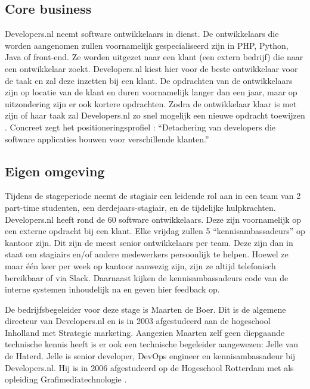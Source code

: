 \subsection{Core business}
Developers.nl neemt software ontwikkelaars in dienst. De ontwikkelaars die worden aangenomen zullen voornamelijk gespecialiseerd zijn in PHP, Python, Java of front-end. Ze worden uitgezet naar een klant (een extern bedrijf) die naar een ontwikkelaar zoekt. Developers.nl kiest hier voor de beste ontwikkelaar voor de taak en zal deze inzetten bij een klant. De opdrachten van de ontwikkelaars zijn op locatie van de klant en duren voornamelijk langer dan een jaar, maar op uitzondering zijn er ook kortere opdrachten. Zodra de ontwikkelaar klaar is met zijn of haar taak zal Developers.nl zo snel mogelijk een nieuwe opdracht toewijzen \parencite{Stageplan}. Concreet zegt het positioneringsprofiel \parencite{Positioneringsprofiel}: \enquote{Detachering van developers die software applicaties bouwen voor verschillende klanten.}

\subsection{Eigen omgeving}

Tijdens de stageperiode neemt de stagiair een leidende rol aan in een team van 2 part-time studenten, een derdejaars-stagiair, en de tijdelijke hulpkrachten. Developers.nl heeft rond de 60 software ontwikkelaars. Deze zijn voornamelijk op een externe opdracht bij een klant. Elke vrijdag zullen 5 \enquote{kennisambassadeurs} op kantoor zijn. Dit zijn de meest senior ontwikkelaars per team. Deze zijn dan in staat om stagiairs en/of andere medewerkers persoonlijk te helpen. Hoewel ze maar één keer per week op kantoor aanwezig zijn, zijn ze altijd telefonisch bereikbaar of via Slack. Daarnaast kijken de kennisambassadeurs code van de interne systemen inhoudelijk na en geven hier feedback op.

De bedrijfsbegeleider voor deze stage is Maarten de Boer. Dit is de algemene directeur van Developers.nl en is in 2003 afgestudeerd aan de hogeschool Inholland met Strategic marketing. Aangezien Maarten zelf geen diepgaande technische kennis heeft is er ook een technische begeleider aangewezen: Jelle van de Haterd. Jelle is senior developer, DevOps engineer en kennisambassadeur bij Developers.nl. Hij is in 2006 afgestudeerd op de Hogeschool Rotterdam met als opleiding Grafimediatechnologie \parencite{Afstudeervoorstel}.